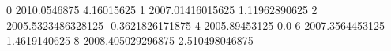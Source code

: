 0 2010.0546875 4.16015625
1 2007.01416015625 1.11962890625
2 2005.5323486328125 -0.3621826171875
4 2005.89453125 0.0
6 2007.3564453125 1.4619140625
8 2008.405029296875 2.510498046875
